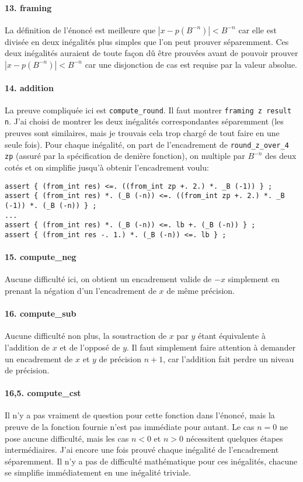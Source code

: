 \documentclass[a4paper]{article}%
\begin{document}
	\paragraph{13. framing} La définition de l'énoncé est meilleure que $|x - p(B^{-n})| < B^{-n}$ car elle
	est divisée en deux inégalités plus simples que l'on peut prouver séparemment.
	Ces deux inégalités auraient de toute façon dû être prouvées avant de pouvoir prouver $|x - p(B^{-n})| < B^{-n}$
	car une disjonction de cas est requise par la valeur absolue.

	\paragraph{14. addition} La preuve compliquée ici est \texttt{compute_round}.
	Il faut montrer \texttt{framing z result n}. J'ai choisi de montrer les deux inégalités
	correspondantes séparemment (les preuves sont similaires, mais je trouvais cela trop chargé de tout faire
	en une seule fois). Pour chaque inégalité, on part de l'encadrement de \texttt{round_z_over_4 zp}
	(assuré par la spécification de denière fonction), on multiple par $B^{-n}$ des deux cotés et on simplifie
	jusqu'à obtenir l'encadrement voulu:
	\begin{verbatim}
assert { (from_int res) <=. ((from_int zp +. 2.) *. _B (-1)) } ;
assert { (from_int res) *. (_B (-n)) <=. ((from_int zp +. 2.) *. _B (-1)) *. (_B (-n)) } ;
...
assert { (from_int res) *. (_B (-n)) <=. lb +. (_B (-n)) } ;
assert { (from_int res -. 1.) *. (_B (-n)) <=. lb } ;
	\end{verbatim}

	\paragraph{15. compute\_neg} Aucune difficulté ici, on obtient un encadrement valide de $-x$ simplement
	en prenant la négation d'un l'encadrement de $x$ de même précision.

	\paragraph{16. compute\_sub} Aucune difficulté non plus, la soustraction de $x$ par $y$
	étant équivalente à l'addition de $x$ et de l'opposé de $y$. Il faut simplement faire attention à
	demander un encadrement de $x$ et $y$ de précision $n+1$, car l'addition fait perdre un niveau de précision.

	\paragraph{16,5. compute\_cst} Il n'y a pas vraiment de question pour cette fonction dans l'énoncé,
	mais la preuve de la fonction fournie n'est pas immédiate pour autant.
	Le cas $n=0$ ne pose aucune difficulté, mais les cas $n<0$ et $n>0$ nécessitent quelques étapes intermédiaires.
	J'ai encore une fois prouvé chaque inégalité de l'encadrement séparemment. Il n'y a pas de difficulté mathématique
	pour ces inégalités, chacune se simplifie immédiatement en une inégalité triviale.
\end{document}
